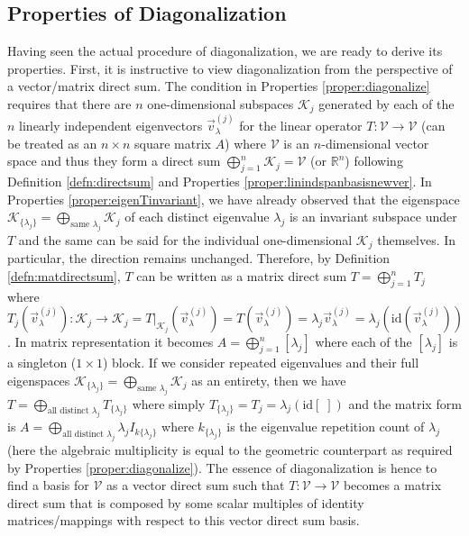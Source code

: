 \subsection{Properties of Diagonalization}
\label{section:diagonalproper}

Having seen the actual procedure of diagonalization, we are ready to derive its properties. First, it is instructive to view diagonalization from the perspective of a vector/matrix direct sum. The condition in Properties \ref{proper:diagonalize} requires that there are $n$ one-dimensional subspaces $\mathcal{K}_j$ generated by each of the $n$ linearly independent eigenvectors $\vec{v}_\lambda^{(j)}$ for the linear operator $T: \mathcal{V} \to \mathcal{V}$ (can be treated as an $n \times n$ square matrix $A$) where $\mathcal{V}$ is an $n$-dimensional vector space and thus they form a direct sum $\bigoplus_{j=1}^n \mathcal{K}_j = \mathcal{V}$ (or $\mathbb{R}^n$) following Definition \ref{defn:directsum} and Properties \ref{proper:linindspanbasisnewver}. In Properties \ref{proper:eigenTinvariant}, we have already observed that the eigenspace $\mathcal{K}_{\{\lambda_j\}} = \bigoplus_{\text{same }\lambda_j} \mathcal{K}_j$ of each distinct eigenvalue $\lambda_j$ is an invariant subspace under $T$ and the same can be said for the individual one-dimensional $\mathcal{K}_j$ themselves. In particular, the direction remains unchanged. Therefore, by Definition \ref{defn:matdirectsum}, $T$ can be written as a matrix direct sum $T = \bigoplus_{j=1}^n T_j$ where $T_j(\vec{v}_\lambda^{(j)}): \mathcal{K}_j \to \mathcal{K}_j = T|_{\mathcal{K}_j}(\vec{v}_\lambda^{(j)}) = T(\vec{v}_\lambda^{(j)}) = \lambda_j\vec{v}_\lambda^{(j)} = \lambda_j(\text{id}(\vec{v}_\lambda^{(j)}))$. In matrix representation it becomes $A = \bigoplus_{j=1}^n [\lambda_j]$ where each of the $[\lambda_j]$ is a singleton ($1 \times 1$) block. If we consider repeated eigenvalues and their full eigenspaces $\mathcal{K}_{\{\lambda_j\}} = \bigoplus_{\text{same }\lambda_j} \mathcal{K}_j$ as an entirety, then we have $T = \bigoplus_{\text{all distinct }\lambda_j} T_{\{\lambda_j\}}$ where simply $T_{\{\lambda_j\}} = T_j = \lambda_j(\text{id}[\;])$ and the matrix form is $A = \bigoplus_{\text{all distinct }\lambda_j} \lambda_j I_{k\{\lambda_j\}}$ where $k_{\{\lambda_j\}}$ is the eigenvalue repetition count of $\lambda_j$ (here the algebraic multiplicity is equal to the geometric counterpart as required by Properties \ref{proper:diagonalize}). The essence of diagonalization is hence to find a basis for $\mathcal{V}$ as a vector direct sum such that $T: \mathcal{V} \to \mathcal{V}$ becomes a matrix direct sum that is composed by some scalar multiples of identity matrices/mappings with respect to this vector direct sum basis.

